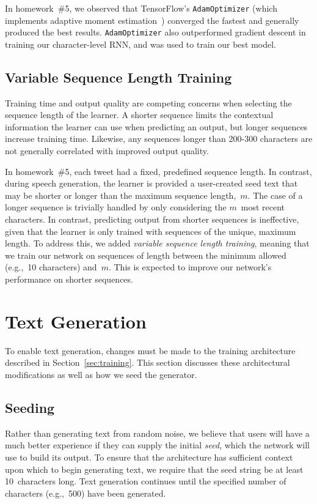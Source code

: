 \documentclass{article}
\begin{document}
In homework~\#5, we observed that TensorFlow's \texttt{AdamOptimizer} (which implements adaptive moment estimation~\cite{kingma2014}) converged the fastest and generally produced the best results.  \texttt{AdamOptimizer} also outperformed gradient descent in training our character-level RNN, and was used to train our best model.  

\subsection{Variable Sequence Length Training}

Training time and output quality are competing concerns when selecting the sequence length of the learner.  A shorter sequence limits the contextual information the learner can use when predicting an output, but longer sequences increase training time.  Likewise, any sequences longer than 200-300 characters are not generally correlated with improved output quality.

In homework~\#5, each tweet had a fixed, predefined sequence length.  In contrast, during speech generation, the learner is provided a user-created seed text that may be shorter or longer than the maximum sequence length,~$m$.  The case of a longer sequence is trivially handled by only considering the $m$~most recent characters.  In contrast, predicting output from shorter sequences is ineffective, given that the learner is only trained with sequences of the unique, maximum length.  To address this, we added \textit{variable sequence length training}, meaning that we train our network on sequences of length between the minimum allowed (e.g.,~10 characters) and~$m$.  This is expected to improve our network's performance on shorter sequences.

\section{Text Generation}

To enable text generation, changes must be made to the training architecture described in Section~\ref{sec:training}.  This section discusses these architectural modifications as well as how we seed the generator.

\subsection{Seeding}

Rather than generating text from random noise, we believe that users will have a much better experience if they can supply the initial \textit{seed}, which the network will use to build its output.  To ensure that the architecture has sufficient context upon which to begin generating text, we require that the seed string be at least 10~characters long.  Text generation continues until the specified number of characters (e.g.,~500) have been generated.
\end{document}

